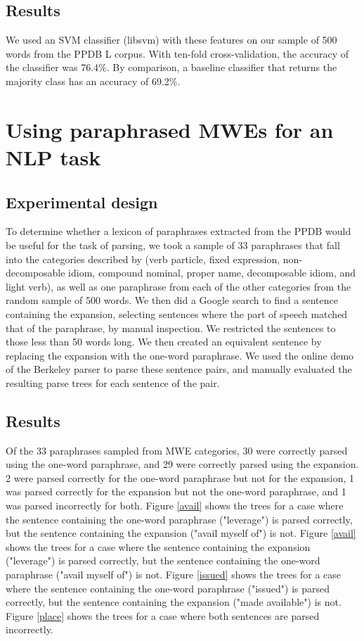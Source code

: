 \documentclass[11pt]{article}
\begin{document}
\subsection{Results}

We used an SVM classifier (libsvm) with these features on our sample of 500 words from the PPDB L corpus. With ten-fold cross-validation, the accuracy of the classifier was 76.4\%. By comparison, a baseline classifier that returns the majority class has an accuracy of 69.2\%. 

\section{Using paraphrased MWEs for an NLP task}

\subsection{Experimental design}

To determine whether a lexicon of paraphrases extracted from the PPDB would be useful for the task of parsing, we took a sample of 33 paraphrases that fall into the categories described by  (verb particle, fixed expression, non-decomposable idiom, compound nominal, proper name, decomposable idiom, and light verb), as well as one paraphrase from each of the other categories from the random sample of 500 words. We then did a Google search to find a sentence containing the expansion, selecting sentences where the part of speech matched that of the paraphrase, by manual inspection. We restricted the sentences to those less than 50 words long. We then created an equivalent sentence by replacing the expansion with the one-word paraphrase. We used the online demo of the Berkeley parser \cite{petrov-EtAl:2006:COLACL} to parse these sentence pairs, and manually evaluated the resulting parse trees for each sentence of the pair.

\subsection{Results}

Of the 33 paraphrases sampled from MWE categories, 30 were correctly parsed using the one-word paraphrase, and 29 were correctly parsed using the expansion. 2 were parsed correctly for the one-word paraphrase but not for the expansion, 1 was parsed correctly for the expansion but not the one-word paraphrase, and 1 was parsed incorrectly for both. Figure \ref{avail} shows the trees for a case where the sentence containing the one-word paraphrase ("leverage") is parsed correctly, but the sentence containing the expansion ("avail myself of") is not. Figure \ref{avail} shows the trees for a case where the sentence containing the expansion ("leverage") is parsed correctly, but the sentence containing the one-word paraphrase ("avail myself of") is not. Figure \ref{issued} shows the trees for a case where the sentence containing the one-word paraphrase ("issued") is parsed correctly, but the sentence containing the expansion ("made available") is not. Figure \ref{place} shows the trees for a case where both sentences are parsed incorrectly.
\end{document}
